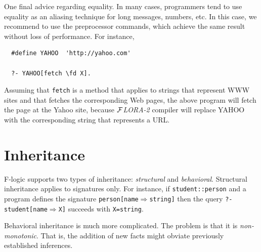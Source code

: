 \documentclass[11pt]{article}
\newcommand{\fd}{\ensuremath{{\rightarrow}}}                   %
\newcommand{\Fd}{\ensuremath{{\Rightarrow}}}                      %
\newcommand{\FLORA}{{\mbox{${\cal F}${\small\it LORA}\rm\emph{-2}}}\xspace}
\newcommand{\fl}{\mbox{F-logic}\xspace}
\begin{document}
One final advice regarding equality. In many cases, programmers tend to use
equality as an aliasing technique for long messages, numbers, etc. In this
case, we recommend to use the preprocessor commands, which achieve the same
result without loss of performance. For instance,

\begin{verbatim}
  #define YAHOO  'http://yahoo.com'  

  ?- YAHOO[fetch \fd X].
\end{verbatim}
\noindent
Assuming that {\tt fetch} is a method that applies to strings that
represent WWW sites and that fetches the corresponding Web pages, the above
program will fetch the page at the Yahoo site, because \FLORA compiler will
replace YAHOO with the corresponding string that represents a URL.


\section{Inheritance}\label{sec-inheritance}


\fl supports two types of inheritance: \emph{structural} and
\emph{behavioral}.  Structural inheritance applies to signatures only. For
instance, if {\tt student::person} and a program defines the signature
{\tt person[name{\Fd}string]} then the query {\tt ?- student[name{\Fd}X]}
succeeds with {\tt X=string}.

Behavioral inheritance is much more complicated. The problem  is that it is
\emph{non-monotonic}. That is, the addition of new facts might obviate previously
established inferences.
\end{document}
